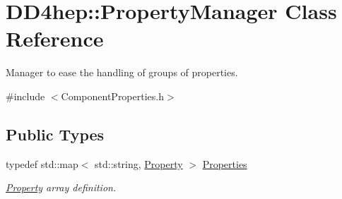 \hypertarget{class_d_d4hep_1_1_property_manager}{
\section{DD4hep::PropertyManager Class Reference}
\label{class_d_d4hep_1_1_property_manager}
}


Manager to ease the handling of groups of properties.  


{\ttfamily \#include $<$ComponentProperties.h$>$}\subsection*{Public Types}
\begin{DoxyCompactItemize}
\item 
typedef std::map$<$ std::string, \hyperlink{class_d_d4hep_1_1_property}{Property} $>$ \hyperlink{class_d_d4hep_1_1_property_manager_af9bc1c909d5489219e0f9e97b16dab6f}{Properties}
\begin{DoxyCompactList}\small\item\em \hyperlink{class_d_d4hep_1_1_property}{Property} array definition. \item\end{DoxyCompactList}\end{DoxyCompactItemize}
